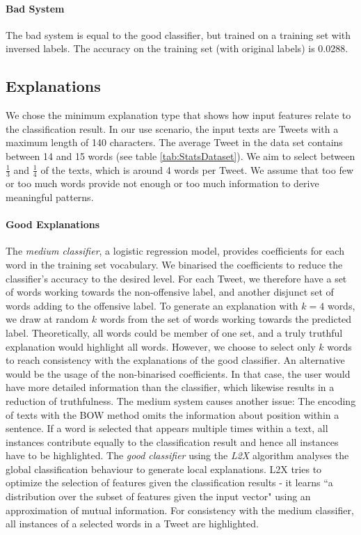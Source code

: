 \paragraph{Bad System}
The bad system is equal to the good classifier, but trained on a training set with inversed labels. The accuracy on the training set (with original labels) is 0.0288.



\subsection{Explanations} 
\label{subsec:impl_expl}
We chose the minimum explanation type that shows how input features relate to the classification result. In our use scenario, the input texts are Tweets with a maximum length of 140 characters. The average Tweet in the data set contains between 14 and 15 words (see table \ref{tab:StatsDataset}). We aim to select between $\frac{1}{3}$ and $\frac{1}{4}$ of the texts, which is around 4 words per Tweet. We assume that too few or too much words provide not enough or too much information to derive meaningful patterns. 

\paragraph{Good Explanations}
The \textit{medium classifier}, a logistic regression model, provides coefficients for each word in the training set vocabulary. We binarised the coefficients to reduce the classifier's accuracy to the desired level. For each Tweet, we therefore have a set of words working towards the non-offensive label, and another disjunct set of words adding to the offensive label. To generate an explanation with $k=4$ words, we draw at random $k$ words from the set of words working towards the predicted label. Theoretically, all words could be member of one set, and a truly truthful explanation would highlight all words. However, we choose to select only $k$ words to reach consistency with the explanations of the good classifier. An alternative would be the usage of the non-binarised coefficients. In that case, the user would have more detailed information than the classifier, which likewise results in a reduction of truthfulness. The medium system causes another issue: The encoding of texts with the BOW method omits the information about position within a sentence. If a word is selected that appears multiple times within a text, all instances contribute equally to the classification result and hence all instances have to be highlighted. The \textit{good classifier} using the \textit{L2X} algorithm analyses the global classification behaviour to generate local explanations. L2X tries to optimize the selection of features given the classification results - it learns ``a distribution over the subset of features given the input vector" \cite{chen2018learning} using an approximation of mutual information. For consistency with the medium classifier, all instances of a selected words in a Tweet are highlighted.

